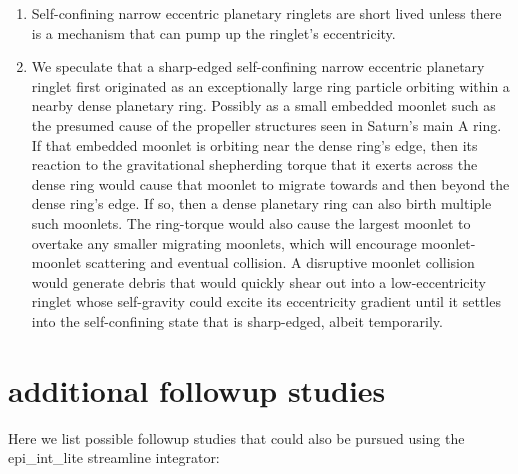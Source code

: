 \documentclass[preprint]{aastex62}
\begin{document}
\begin{enumerate}
\item Self-confining narrow eccentric planetary ringlets are short lived unless there is a mechanism
that can pump up the ringlet's eccentricity.

\item We speculate that a sharp-edged self-confining narrow eccentric planetary ringlet first originated as
an exceptionally large ring particle orbiting within a nearby dense planetary ring. 
Possibly as a small embedded moonlet such as the presumed cause of the propeller structures
seen in Saturn's main A ring. If that embedded moonlet is orbiting near the dense ring's edge, then
its reaction to the gravitational shepherding torque that it exerts across the dense ring would
cause that moonlet to migrate towards and then beyond the dense ring's edge. If so, then 
a dense planetary ring can also birth multiple such moonlets. The ring-torque would also 
cause the largest moonlet to overtake any smaller migrating moonlets, which will encourage
moonlet-moonlet scattering and eventual collision. A disruptive moonlet collision
would generate debris that would quickly
shear out into a low-eccentricity ringlet whose self-gravity could excite its eccentricity gradient
until it settles into the self-confining state that is sharp-edged, albeit temporarily. 

\end{enumerate}


\section{additional followup studies}
\label{sec:followup}

Here we list possible followup studies that could also be pursued using the epi\_int\_lite streamline integrator:
\end{document}
